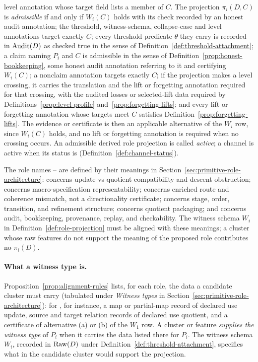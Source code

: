\begin{definition}
level annotation whose target field lists a member of \(C\). The projection \(\pi_i(D,C)\) is \emph{admissible} if and only if
\(W_i(C)\) holds with its check recorded by an honest audit annotation; the
threshold, witness-schema, collapse-case and level annotations target exactly
\(C\); every threshold predicate \(\theta\) they carry is recorded in \(\operatorname{Audit}\!\left(D\right)\) as
checked true in the sense of Definition~\ref{def:threshold-attachment}; a claim naming \(P_i\) and \(C\) is admissible in the sense of
Definition~\ref{prop:honest-bookkeeping}, some honest audit annotation
referring to it and certifying \(W_i(C)\); a nonclaim annotation targets exactly \(C\); if the
projection makes a level crossing, it carries the translation and the lift or
forgetting annotation required for that crossing, with the audited losses or
selected-lift data required by Definitions~\ref{prop:level-profile}
and~\ref{prop:forgetting-lifts}; and every lift or forgetting annotation whose
targets meet \(C\) satisfies Definition~\ref{prop:forgetting-lifts}. The
evidence or certificate is then an applicable alternative of the \(W_i\) row,
since \(W_i(C)\) holds, and no lift or forgetting annotation is required when
no crossing occurs. An admissible derived role projection is called
\emph{active}; a channel is active when its status is \activeproj{}
(Definition~\ref{def:channel-status}).
\end{definition}

\begin{remark}\label{rem:fixed-role-meanings}
The role names \Pone{}--\Psix{} are defined by their meanings in
Section~\ref{sec:primitive-role-architecture}: \Pone{} concerns
update-vs-quotient compatibility and descent obstruction; \Ptwo{} concerns
macro-specification representability; \Pthree{} concerns enriched
route and coherence mismatch, not a directionality certificate; \Pfour{}
concerns stage, order, transition, and refinement structure; \Pfive{}
concerns quotient packaging; and
\Psix{} concerns audit, bookkeeping, provenance, replay, and checkability.
The witness schema \(W_i\) in Definition~\ref{def:role-projection} must be
aligned with these meanings; a cluster whose raw features do not support the
meaning of the proposed role contributes no \(\pi_i(D)\).
\end{remark}

\paragraph{What a witness type is.} Proposition~\ref{prop:alignment-rules}
lists, for each role, the data a candidate cluster must carry (tabulated
under \emph{Witness types} in Section~\ref{sec:primitive-role-architecture}): for \Pone{},
for instance, a map or partial-map record of declared use update, source and target relation records of declared use quotient, and a certificate of alternative (a) or (b) of the \(W_1\) row.
A cluster or feature \emph{supplies the witness type} of \(P_i\) when it
carries the data listed there for \(P_i\). The witness schema \(W_i\), recorded in
\(\operatorname{Raw}\!\left(D\right)\) under Definition~\ref{def:threshold-attachment}, specifies what in
the candidate cluster would support the projection.

